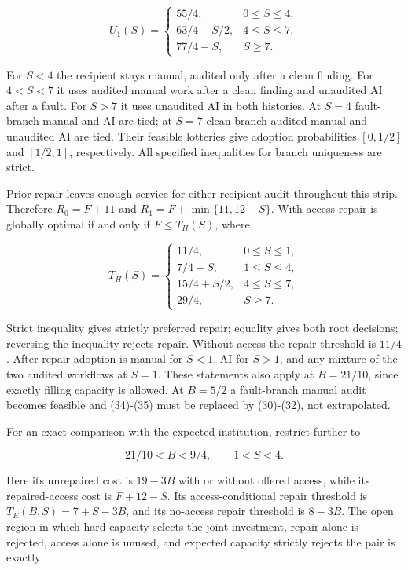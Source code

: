 \documentclass[
  11pt,
  a4paper,
]{article}
\begin{document}
\[U_1(S)=\begin{cases}
55/4,&0\leq S\leq4,\\
63/4-S/2,&4\leq S\leq7,\\
77/4-S,&S\geq7.
\end{cases} \tag{34}\]

For \(S<4\) the recipient stays manual, audited only after a clean
finding. For \(4<S<7\) it uses audited manual work after a clean finding
and unaudited AI after a fault. For \(S>7\) it uses unaudited AI in both
histories. At \(S=4\) fault-branch manual and AI are tied; at \(S=7\)
clean-branch audited manual and unaudited AI are tied. Their feasible
lotteries give adoption probabilities \([0,1/2]\) and \([1/2,1]\),
respectively. All specified inequalities for branch uniqueness are
strict.

Prior repair leaves enough service for either recipient audit throughout
this strip. Therefore \(R_0=F+11\) and \(R_1=F+\min\{11,12-S\}\). With
access repair is globally optimal if and only if \(F\leq T_H(S)\), where

\[T_H(S)=\begin{cases}
11/4,&0\leq S\leq1,\\
7/4+S,&1\leq S\leq4,\\
15/4+S/2,&4\leq S\leq7,\\
29/4,&S\geq7.
\end{cases} \tag{35}\]

Strict inequality gives strictly preferred repair; equality gives both
root decisions; reversing the inequality rejects repair. Without access
the repair threshold is \(11/4\). After repair adoption is manual for
\(S<1\), AI for \(S>1\), and any mixture of the two audited workflows at
\(S=1\). These statements also apply at \(B=21/10\), since exactly
filling capacity is allowed. At \(B=5/2\) a fault-branch manual audit
becomes feasible and (34)-(35) must be replaced by (30)-(32), not
extrapolated.

For an exact comparison with the expected institution, restrict further
to

\[21/10<B<9/4,\qquad1<S<4. \tag{36}\]

Here its unrepaired cost is \(19-3B\) with or without offered access,
while its repaired-access cost is \(F+12-S\). Its access-conditional
repair threshold is \(T_E(B,S)=7+S-3B\), and its no-access repair
threshold is \(8-3B\). The open region in which hard capacity selects
the joint investment, repair alone is rejected, access alone is unused,
and expected capacity strictly rejects the pair is exactly
\end{document}
